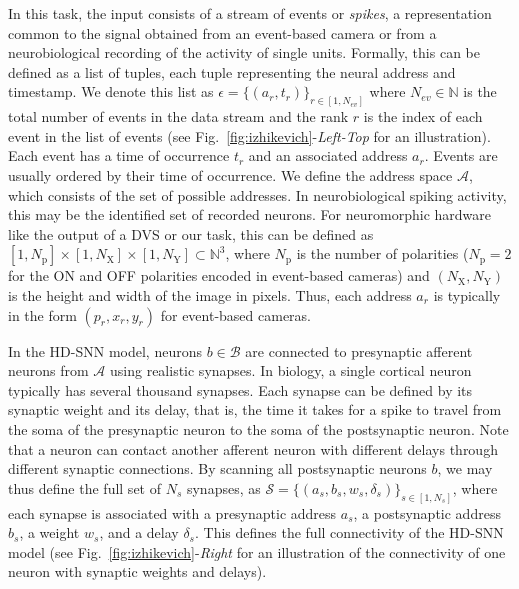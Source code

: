 \documentclass[default]{sn-jnl}%
\theoremstyle{thmstyleone}%
\theoremstyle{thmstyletwo}%
\theoremstyle{thmstylethree}%
\newcommand{\seeFig}[1]{see Fig.~\ref{fig:#1}}%
\newcommand{\presynaddr}{a} %
\newcommand{\postsynaddr}{b} %
\newcommand{\numevent}{N_{ev}} %
\newcommand{\presynaddrspace}{\mathcal{A}} %
\newcommand{\postsynaddrspace}{\mathcal{B}} %
\newcommand{\Npol}{N_\text{p}} %
\newcommand{\arank}{r} %
\newcommand{\synapse}{\mathcal{S}} %
\newcommand{\synapticweight}{w} %
\newcommand{\synapticdelay}{\delta} %
\newcommand{\ranksyn}{s} %
\newcommand{\Nsyn}{N_{s}} %
\newcommand{\timev}{t} %
\newcommand{\polev}{p} %
\newcommand{\event}{\epsilon} %
\newcommand{\Nx}{N_\text{X}}
\newcommand{\Ny}{N_\text{Y}}
\begin{document}
In this task, the input consists of a stream of events or \emph{spikes}, a representation common to the signal obtained from an event-based camera or from a neurobiological recording of the activity of single units. Formally, this can be defined as a list of tuples, each tuple representing the neural address and timestamp. We denote this list as $\event = \{(\presynaddr_\arank, \timev_\arank)\}_{\arank \in [1,\numevent]}$ where $\numevent \in \mathbb{N}$ is the total number of events in the data stream and the rank $\arank$ is the index of each event in the list of events (\seeFig{izhikevich}-\textit{Left-Top} for an illustration). Each event has a time of occurrence $\timev_\arank$ and an associated address $\presynaddr_\arank$. Events are usually ordered by their time of occurrence. We define the address space $\presynaddrspace$, which consists of the set of possible addresses. In neurobiological spiking activity, this may be the identified set of recorded neurons. For neuromorphic hardware like the output of a DVS or our task, this can be defined as $[1, \Npol] \times [1, \Nx]\times[1, \Ny] \subset \mathbb{N}^3$, where $\Npol$ is the number of polarities ($\Npol=2$ for the ON and OFF polarities encoded in event-based cameras) and $(\Nx, \Ny)$ is the height and width of the image in pixels. Thus, each address $\presynaddr_\arank$ is typically in the form $(\polev_\arank, x_\arank, y_\arank)$ for event-based cameras.

In the HD-SNN model, neurons $\postsynaddr \in \postsynaddrspace$ are connected to presynaptic afferent neurons from $\presynaddrspace$ using realistic synapses. In biology, a single cortical neuron typically has several thousand synapses. Each synapse can be defined by its synaptic weight and its delay, that is, the time it takes for a spike to travel from the soma of the presynaptic neuron to the soma of the postsynaptic neuron. Note that a neuron can contact another afferent neuron with different delays through different synaptic connections. By scanning all postsynaptic neurons $\postsynaddr$, we may thus define the full set of $\Nsyn$ synapses, as $\synapse = \{(\presynaddr_\ranksyn, \postsynaddr_\ranksyn, \synapticweight_\ranksyn, \synapticdelay_\ranksyn)\}_{\ranksyn \in [1,\Nsyn]}$, where each synapse is associated with a presynaptic address $\presynaddr_\ranksyn$, a postsynaptic address $\postsynaddr_\ranksyn$, a weight $\synapticweight_\ranksyn$, and a delay $\synapticdelay_\ranksyn$. This defines the full connectivity of the HD-SNN model (\seeFig{izhikevich}-\textit{Right} for an illustration of the connectivity of one neuron with synaptic weights and delays). %
\end{document}
